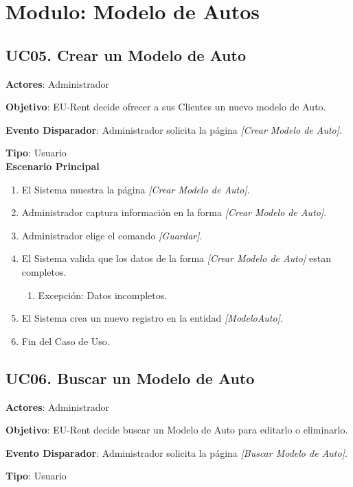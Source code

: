 \section{Modulo: Modelo de Autos}

\subsection{UC05. Crear un Modelo de Auto} \label{CrearModeloAuto}
\textbf{Actores}: Administrador

\textbf{Objetivo}: EU-Rent decide ofrecer a sus Clientes un nuevo modelo de Auto.

\textbf{Evento Disparador}: Administrador solicita la página \textit{[Crear Modelo de Auto]}.

\textbf{Tipo}: Usuario\\

\textbf{Escenario Principal}

\begin{enumerate}
\item El Sistema muestra la página \textit{[Crear Modelo de Auto]}.
\item Administrador captura información en la forma \textit{[Crear Modelo de Auto]}.
\item Administrador elige el comando \textit{[Guardar]}.
\item El Sistema valida que los datos de la forma \textit{[Crear Modelo de Auto]} estan completos.
	\begin{enumerate}
		\item Excepción: Datos incompletos.
	\end{enumerate}
\item El Sistema crea un nuevo registro en la entidad \textit{[ModeloAuto]}.
\item Fin del Caso de Uso.
\end{enumerate}
\subsection{UC06. Buscar un Modelo de Auto} \label{BuscarModeloAuto}
\textbf{Actores}: Administrador

\textbf{Objetivo}: EU-Rent decide buscar un Modelo de Auto para editarlo o eliminarlo.

\textbf{Evento Disparador}: Administrador solicita la página \textit{[Buscar Modelo de Auto]}.

\textbf{Tipo}: Usuario\\

